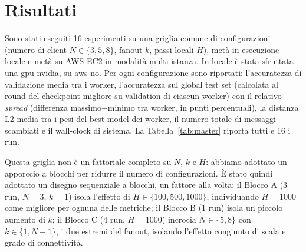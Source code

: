 \section{Risultati}
\label{sec:results}

Sono stati eseguiti 16 esperimenti su una griglia comune di configurazioni
(numero di client $N \in \{3,5,8\}$, fanout $k$, passi locali $H$),
metà in esecuzione locale e metà su
AWS EC2 in modalità multi-istanza.
In locale è stata sfruttata una gpu nvidia, su aws no. Per ogni
configurazione sono riportati: l'accuratezza di validazione media tra i
worker, l'accuratezza sul global test set (calcolata al round del checkpoint
migliore su validation di ciascun worker) con il
relativo \emph{spread} (differenza massimo$-$minimo tra worker, in punti
percentuali), la distanza L2 media tra i pesi del best model dei worker, il numero
totale di messaggi scambiati e il wall-clock di sistema. La
Tabella~\ref{tab:master} riporta tutti e 16 i run.

Questa griglia non è un fattoriale completo su $N$, $k$ e $H$: abbiamo adottato un apporccio a blocchi per ridurre il numero di configurazioni.
È stato quindi adottato un disegno sequenziale a
blocchi, un fattore alla volta: il Blocco A (3 run, $N=3$, $k=1$) isola
l'effetto di $H \in \{100,500,1000\}$, individuando $H=1000$ come migliore per ognuna delle metriche;
il Blocco B (1 run) isola un piccolo aumento di $k$; il Blocco C (4 run,
$H=1000$) incrocia $N \in \{5,8\}$ con $k \in \{1, N{-}1\}$, i due estremi
del fanout, isolando l'effetto congiunto di scala e grado di connettività.

